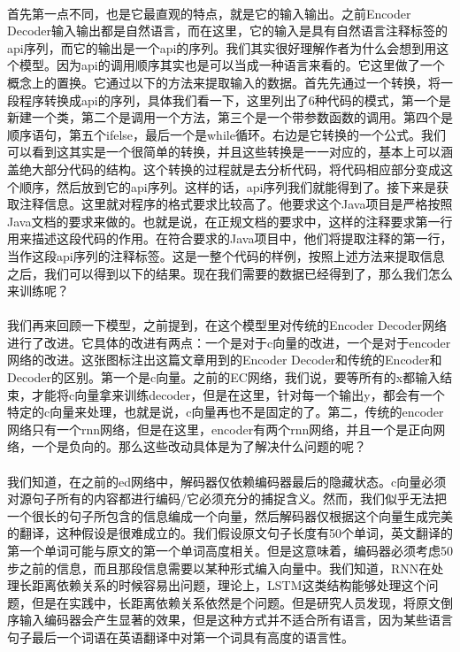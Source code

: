 \documentclass[UTF8]{ctexart}
\begin{document}
			\paragraph{}
			首先第一点不同，也是它最直观的特点，就是它的输入输出。之前Encoder Decoder输入输出都是自然语言，而在这里，它的输入是具有自然语言注释标签的api序列，而它的输出是一个api的序列。我们其实很好理解作者为什么会想到用这个模型。因为api的调用顺序其实也是可以当成一种语言来看的。它这里做了一个概念上的置换。它通过以下的方法来提取输入的数据。首先先通过一个转换，将一段程序转换成api的序列，具体我们看一下，这里列出了6种代码的模式，第一个是新建一个类，第二个是调用一个方法，第三个是一个带参数函数的调用。第四个是顺序语句，第五个ifelse，最后一个是while循环。右边是它转换的一个公式。我们可以看到这其实是一个很简单的转换，并且这些转换是一一对应的，基本上可以涵盖绝大部分代码的结构。这个转换的过程就是去分析代码，将代码相应部分变成这个顺序，然后放到它的api序列。这样的话，api序列我们就能得到了。接下来是获取注释信息。这里就对程序的格式要求比较高了。他要求这个Java项目是严格按照Java文档的要求来做的。也就是说，在正规文档的要求中，这样的注释要求第一行用来描述这段代码的作用。在符合要求的Java项目中，他们将提取注释的第一行，当作这段api序列的注释标签。这是一整个代码的样例，按照上述方法来提取信息之后，我们可以得到以下的结果。现在我们需要的数据已经得到了，那么我们怎么来训练呢？
			\paragraph{}	
			我们再来回顾一下模型，之前提到，在这个模型里对传统的Encoder Decoder网络进行了改进。它具体的改进有两点：一个是对于c向量的改进，一个是对于encoder网络的改进。这张图标注出这篇文章用到的Encoder Decoder和传统的Encoder和Decoder的区别。第一个是c向量。之前的EC网络，我们说，要等所有的x都输入结束，才能将c向量拿来训练decoder，但是在这里，针对每一个输出y，都会有一个特定的c向量来处理，也就是说，c向量再也不是固定的了。第二，传统的encoder网络只有一个rnn网络，但是在这里，encoder有两个rnn网络，并且一个是正向网络，一个是负向的。那么这些改动具体是为了解决什么问题的呢？
			\paragraph{}
			我们知道，在之前的ed网络中，解码器仅依赖编码器最后的隐藏状态。c向量必须对源句子所有的内容都进行编码/它必须充分的捕捉含义。然而，我们似乎无法把一个很长的句子所包含的信息编成一个向量，然后解码器仅根据这个向量生成完美的翻译，这种假设是很难成立的。我们假设原文句子长度有50个单词，英文翻译的第一个单词可能与原文的第一个单词高度相关。但是这意味着，编码器必须考虑50步之前的信息，而且那段信息需要以某种形式编入向量中。我们知道，RNN在处理长距离依赖关系的时候容易出问题，理论上，LSTM这类结构能够处理这个问题，但是在实践中，长距离依赖关系依然是个问题。但是研究人员发现，将原文倒序输入编码器会产生显著的效果，但是这种方式并不适合所有语言，因为某些语言句子最后一个词语在英语翻译中对第一个词具有高度的语言性。
\end{document}
